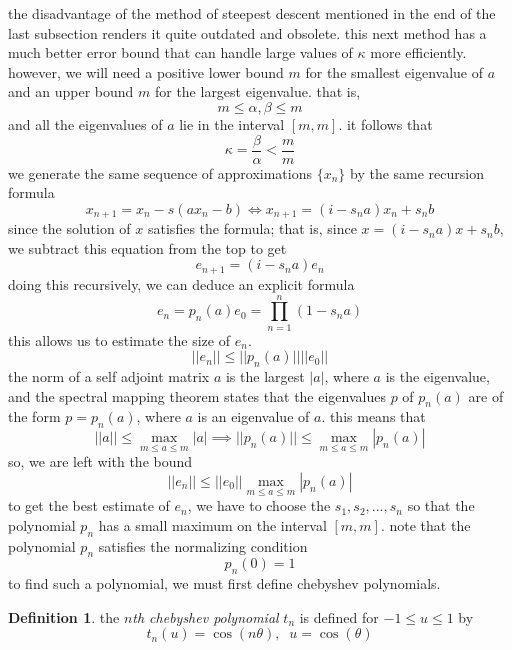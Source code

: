 \documentclass{article}
\theoremstyle{remark}
\theoremstyle{definition}
\newtheorem{definition}{Definition}[section]
\begin{document}
    the disadvantage of the method of steepest descent mentioned in the end of the last subsection renders it quite outdated and obsolete. this next method has a much better error bound that can handle large values of $\kappa$ more efficiently. however, we will need a positive lower bound $m$ for the smallest eigenvalue of $a$ and an upper bound $m$ for the largest eigenvalue. that is, 
    \[m \leq \alpha, \beta \leq m\]
    and all the eigenvalues of $a$ lie in the interval $[m, m]$. it follows that
    \[\kappa = \frac{\beta}{\alpha} < \frac{m}{m}\]
    we generate the same sequence of approximations $\{x_n\}$ by the same recursion formula
    \[x_{n+1} = x_n - s(a x_n - b) \iff x_{n+1} = (i - s_n a) x_n + s_n b\]
    since the solution of $x$ satisfies the formula; that is, since $x = (i - s_n a) x + s_n b$, we subtract this equation from the top to get
    \[e_{n+1} = (i - s_n a) e_n\]
    doing this recursively, we can deduce an explicit formula 
    \[e_n = p_n (a) e_0 = \prod_{n=1}^n (1 - s_n a)\]
    this allows us to estimate the size of $e_n$. 
    \[||e_n|| \leq ||p_n (a)|| ||e_0||\]
    the norm of a self adjoint matrix $a$ is the largest $|a|$, where $a$ is the eigenvalue, and the spectral mapping theorem states that the eigenvalues $p$ of $p_n (a)$ are of the form $p = p_n (a)$, where $a$ is an eigenvalue of $a$. this means that
    \[||a|| \leq \max_{m \leq a \leq m} |a| \implies ||p_n (a)|| \leq \max_{m \leq a \leq m} |p_n (a)|\]
    so, we are left with the bound
    \[||e_n|| \leq ||e_0|| \max_{m \leq a \leq m} |p_n (a)|\]
    to get the best estimate of $e_n$, we have to choose the $s_1, s_2, ..., s_n$ so that the polynomial $p_n$ has a small maximum on the interval $[m, m]$. note that the polynomial $p_n$ satisfies the normalizing condition 
    \[p_n(0) = 1\]
    to find such a polynomial, we must first define chebyshev polynomials. 

    \begin{definition}
    the \textit{$n$th chebyshev polynomial} $t_n$ is defined for $-1 \leq u \leq 1$ by
    \[t_n (u) = \cos (n \theta), \;\; u = \cos(\theta)\]
    \end{definition}
\end{document}
